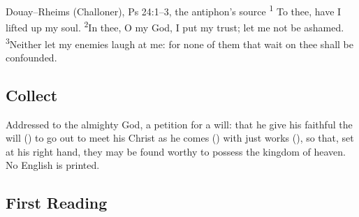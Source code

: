 \begin{englishwitness}{Douay--Rheims (Challoner), Ps 24:1--3, the antiphon's source}
\textsuperscript{1} To thee,  have I lifted up my soul. \textsuperscript{2}In thee, O my God, I put
my trust; let me not be ashamed. \textsuperscript{3}Neither let my enemies
laugh at me: for none of them that wait on thee shall be confounded.
\end{englishwitness}

\subsection{Collect}
\label{proper-collect}


\noindent Addressed to the almighty God, a petition for a will: that he give
his faithful the will () to go out to meet his Christ as he
comes () with just works (), so that, set at his right hand, they may be found worthy to
possess the kingdom of heaven. No English is printed.

\subsection{First Reading}
\label{proper-first-reading}


